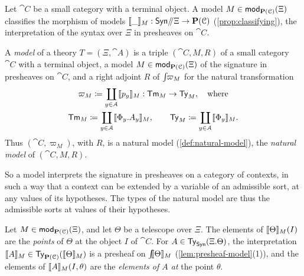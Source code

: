 Let $\cat{C}$ be a small category with a terminal object. A model $M \in \mathsf{mod}_{\mathbf{P}(\mathcal{C})}(\Xi)$ classifies the morphism of models $\llbracket\_\rrbracket_M : \mathsf{Syn}\mathord{/\mkern-5mu/}\Xi \to \mathbf{P}(\mathcal{C})$ (\cref{prop:classifying}), the interpretation of the syntax over $\Xi$ in presheaves on $\cat{C}$.

\begin{definition}\label{def:theory-model}
    A \emph{model} of a theory $T = (\Xi, \cat{A})$ is a triple $(\cat{C}, M, R)$ of a small category $\cat{C}$ with a terminal object, a model $M \in \mathsf{mod}_{\mathbf{P}(\mathcal{C})}(\Xi)$ of the signature in presheaves on $\cat{C}$, and a right adjoint $R$ of $\int\!\!\varpi_M$ for the natural transformation
    \begin{gather*}
        \varpi_M \coloneqq \coprod_{y \in \mathcal{A}} \llbracket p_y\rrbracket_M : \mathsf{Tm}_M \to \mathsf{Ty}_M, \quad \text{where}\\
        \mathsf{Tm}_M \coloneqq \coprod_{y \in \mathcal{A}} \llbracket\Phi_y.A_y\rrbracket_M, \qquad \mathsf{Ty}_M \coloneqq \coprod_{y \in \mathcal{A}} \llbracket\Phi_y\rrbracket_M.
    \end{gather*}
    Thus $(\cat{C}, \varpi_M)$, with $R$, is a natural model (\cref{def:natural-model}), the \emph{natural model} of $(\cat{C}, M, R)$.
\end{definition}

So a model interprets the signature in presheaves on a category of contexts, in such a way that a context can be extended by a variable of an admissible sort, at any values of its hypotheses. The types of the natural model are thus the admissible sorts at values of their hypotheses.

\begin{definition}\label{def:points}
    Let $M \in \mathsf{mod}_{\mathbf{P}(\mathcal{C})}(\Xi)$, and let $\Theta$ be a telescope over $\Xi$. The elements of $\llbracket\Theta\rrbracket_M(I)$ are the \emph{points} of $\Theta$ at the object $I$ of $\cat{C}$. For $A \in \mathsf{Ty}_{\mathsf{Syn}}(\Xi.\Theta)$, the interpretation $\llbracket A\rrbracket_M \in \mathsf{Ty}_{\mathbf{P}(\mathcal{C})}(\llbracket\Theta\rrbracket_M)$ is a presheaf on $\int\!\!\llbracket\Theta\rrbracket_M$ (\cref{lem:presheaf-model}(1)), and the elements of $\llbracket A\rrbracket_M(I, \theta)$ are the \emph{elements of $A$ at} the point $\theta$.
\end{definition}

